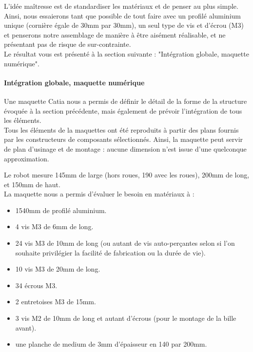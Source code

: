 			L'idée maîtresse est de standardiser les matériaux et de penser au plus simple. Ainsi, nous essaierons tant que possible de tout faire avec un profilé aluminium unique (cornière égale de 30mm par 30mm), un seul type de vis et d'écrou (M3) et penserons notre assemblage de manière à être aisément réalisable, et ne présentant pas de risque de sur-contrainte.\\

			Le résultat vous est présenté à la section suivante : "Intégration globale, maquette numérique".

		\paragraph{Intégration globale, maquette numérique}

			Une maquette Catia nous a permis de définir le détail de la forme de la structure évoquée à la section précédente, mais également de prévoir l'intégration de tous les éléments.\\

			Tous les éléments de la maquettes ont été reproduits à partir des plans fournis par les constructeurs de composants sélectionnés. Ainsi, la maquette peut servir de plan d'usinage et de montage : aucune dimension n'est issue d'une quelconque approximation.

			\vspace{30pt}


			Le robot mesure 145mm de large (hors roues, 190 avec les roues), 200mm de long, et 150mm de haut.\\

			La maquette nous a permis d'évaluer le besoin en matériaux à :

			\begin{itemize}
				\item 1540mm de profilé aluminium.
				\item 4 vis M3 de 6mm de long.
				\item 24 vis M3 de 10mm de long (ou autant de vis auto-perçantes selon si l'on souhaite privilégier la facilité de fabrication ou la durée de vie).
				\item 10 vis M3 de 20mm de long.
				\item 34 écrous M3.
				\item 2 entretoises M3 de 15mm.
				\item 3 vis M2 de 10mm de long et autant d'écrous (pour le montage de la bille avant).
				\item une planche de medium de 3mm d'épaisseur en 140 par 200mm.
			\end{itemize}

